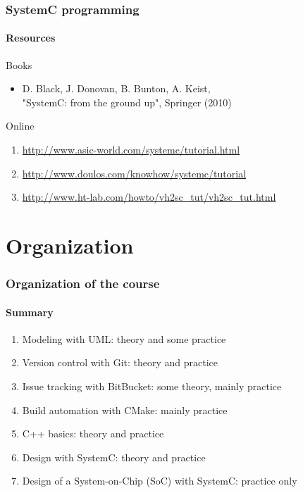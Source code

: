 \begin{frame}
\frametitle{SystemC programming}
\framesubtitle{Resources}
\begin{block}{Books}
\begin{itemize}
\item D. Black, J. Donovan, B. Bunton, A. Keist, \\  "SystemC: from the ground up", Springer (2010)
\end{itemize}
\end{block}

\begin{block}{Online}
\begin{enumerate}
\item \url{http://www.asic-world.com/systemc/tutorial.html}
\item \url{http://www.doulos.com/knowhow/systemc/tutorial}
\item \url{http://www.ht-lab.com/howto/vh2sc_tut/vh2sc_tut.html}
\end{enumerate}
\end{block}

\end{frame}

\section{Organization}

\begin{frame}
\frametitle{Organization of the course}
\framesubtitle{Summary}
\begin{enumerate}
\item Modeling with UML: theory and some practice
\item Version control with Git: theory and practice
\item Issue tracking with BitBucket: some theory, mainly practice
\item Build automation with CMake: mainly practice
\item C++ basics: theory and practice
\item Design with SystemC: theory and practice
\item Design of a System-on-Chip (SoC) with SystemC: practice only
\end{enumerate}
\end{frame}

